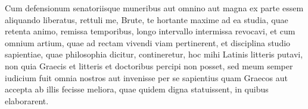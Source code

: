 \documentclass[11pt,b5paper,twoside]{book}
\begin{document}
\pstart{}%
Cum defensionum  senatoriisque muneribus aut omnino aut magna ex parte essem aliquando liberatus, rettuli me, Brute, te hortante maxime ad ea studia, quae retenta animo, remissa temporibus, longo intervallo intermissa revocavi, et cum omnium artium, quae ad rectam vivendi viam pertinerent,  et disciplina studio sapientiae, quae philosophia dicitur, contineretur, hoc mihi Latinis litteris  putavi, non quia  Graecis et litteris et doctoribus percipi non posset, sed meum semper iudicium fuit omnia nostros aut invenisse per se sapientius quam Graecos aut accepta ab illis fecisse meliora, quae quidem digna statuissent, in quibus elaborarent.
\pend

\numberpstartfalse
\endnumbering
\end{document}
